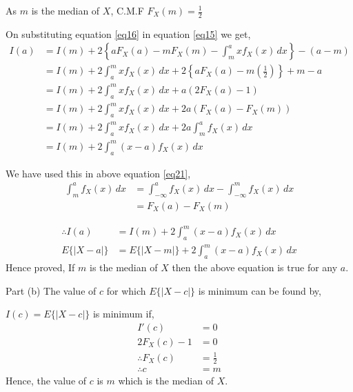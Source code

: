 \documentclass{beamer}
\providecommand{\cbrak}[1]{\ensuremath{\left\{#1\right\}}}
\begin{document}
\begin{frame}{}
   As $m$ is the median of $X$, C.M.F $F_X(m) = \frac{1}{2}$ 
   
   On substituting equation \eqref{eq16} in equation \eqref{eq15} we get,
   \begin{align}
      I(a) &= I(m) + 2 \cbrak{a F_X(a) - m F_X(m) - \int_{m}^{a} x f_X(x)   \, dx} - (a - m) \\
           &= I(m) + 2\int_{a}^{m} x f_X(x)   \, dx + 2 \cbrak{a F_X(a) - m(\frac{1}{2})} + m - a \\
           &= I(m) + 2\int_{a}^{m} x f_X(x)   \, dx + a( 2F_X(a) - 1) \\
           &= I(m) + 2\int_{a}^{m} x f_X(x)   \, dx + 2a( F_X(a) - F_X(m)) \\
           &= I(m) + 2\int_{a}^{m} x f_X(x)   \, dx + 2a \int_{m}^{a} f_X(x) \, dx  \label{eq21} \\
           &= I(m) + 2\int_{a}^{m} (x - a) f_X(x)   \, dx
   \end{align}
\end{frame}


\begin{frame}{}
   We have used this in above equation \eqref{eq21},
   \begin{align}
      \int_{m}^{a} f_X(x) \, dx &= \int_{-\infty}^{a} f_X(x) \, dx - \int_{-\infty}^{m} f_X(x) \, dx  \\
      						   &= F_X(a) - F_X(m)
   \end{align}
   
   \begin{align}
      \therefore I(a) &= I(m) + 2\int_{a}^{m} (x - a) f_X(x)   \, dx \\
           E\{|X-a|\} &= E\{|X-m|\} + 2\int_{a}^{m} (x - a) f_X(x)   \, dx
   \end{align}
   Hence proved, If $m$ is the median of $X$ then the above equation is true for any $a$.
\end{frame}


\begin{frame}{Part (b)}
   The value of $c$ for which $E\{|X-c|\}$ is minimum can be found by,
   
   $I(c) = E\{|X-c|\}$ is minimum if,
   \begin{align}
     I'(c) &= 0 \\
     2 F_X(c) - 1 &= 0 \\
     \therefore F_X(c) &= \frac{1}{2} \\
          \therefore c &= m 
   \end{align}
    Hence, the value of $c$ is $m$ which is the median of $X$.
\end{frame}
\end{document}
